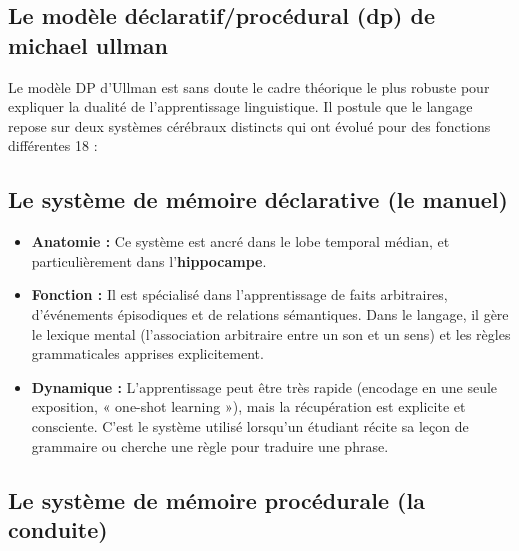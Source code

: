 \subsection{Le modèle déclaratif/procédural (dp) de michael ullman}

Le modèle DP d'Ullman est sans doute le cadre théorique le plus robuste pour expliquer la dualité de
l'apprentissage linguistique. Il postule que le langage repose sur deux systèmes cérébraux distincts
qui ont évolué pour des fonctions différentes 18 :



\subsection{Le système de mémoire déclarative (le manuel)}

\begin{itemize}\item \textbf{Anatomie :} Ce système est ancré dans le lobe temporal médian, et particulièrement dans l'\textbf{hippocampe}.\item \textbf{Fonction :} Il est spécialisé dans l'apprentissage de faits arbitraires, d'événements épisodiques et de relations sémantiques. Dans le langage, il gère le lexique mental (l'association arbitraire entre un son et un sens) et les règles grammaticales apprises explicitement.\item \textbf{Dynamique :} L'apprentissage peut être très rapide (encodage en une seule exposition, « one-shot learning »), mais la récupération est explicite et consciente. C'est le système utilisé lorsqu'un étudiant récite sa leçon de grammaire ou cherche une règle pour traduire une phrase.\end{itemize}

\subsection{Le système de mémoire procédurale (la conduite)}

